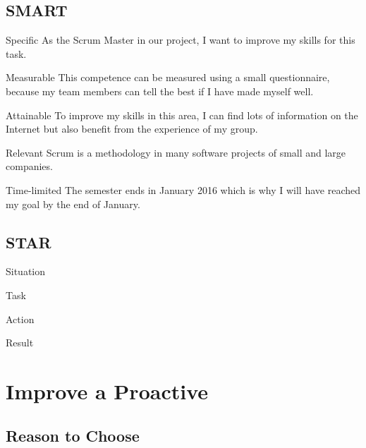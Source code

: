 \documentclass[12pt]{article}
\begin{document}
		\subsection{SMART}
		\begin{SMART}
		    \item[Specific] As the Scrum Master in our project, I want to improve my skills for this task.
		    \item[Measurable] This competence can be measured using a small questionnaire, because my team members can tell the best if I have made myself well.
		    \item[Attainable] To improve my skills in this area, I can find lots of information on the Internet but also benefit from the experience of my group.
		    \item[Relevant] Scrum is a methodology in many software projects of small and large companies.
		    \item[Time-limited] The semester ends in January 2016 which is why I will have reached my goal by the end of January.
		\end{SMART}
		
		\subsection{STAR}
		\begin{STAR}
		    \item[Situation] 
		    \item[Task] 
		    \item[Action] 
		    \item[Result] 
		\end{STAR}
	\pagebreak

	\section{Improve a Proactive}
		\subsection{Reason to Choose}
			
	
\end{document}
